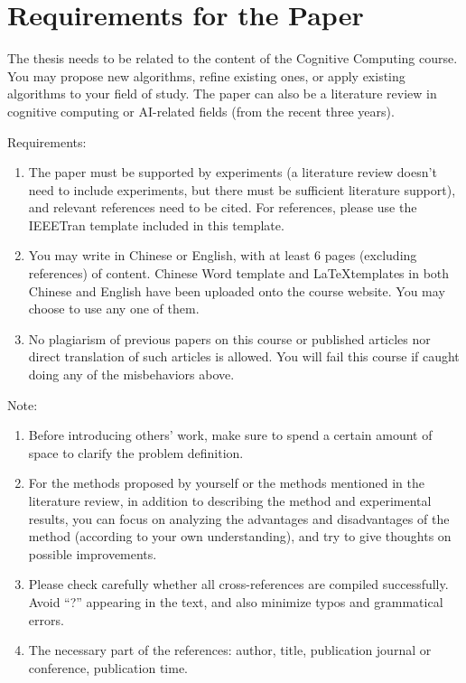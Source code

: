 \documentclass[conference]{IEEEtran}
\begin{document}
\section*{Requirements for the Paper}

The thesis needs to be related to the content of the Cognitive Computing course. You may propose new algorithms, refine existing ones, or apply existing algorithms to your field of study. The paper can also be a literature review in cognitive computing or AI-related fields (from the recent three years).

Requirements:
\begin{enumerate}
	\item The paper must be supported by experiments (a literature review doesn't need to include experiments, but there must be sufficient literature support), and relevant references need to be cited. For references, please use the IEEETran template included in this template.
	\item You may write in Chinese or English, with at least 6 pages (excluding references) of content. Chinese Word template and \LaTeX templates in both Chinese and English have been uploaded onto the course website. You may choose to use any one of them.
	\item No plagiarism of previous papers on this course or published articles nor direct translation of such articles is allowed. You will fail this course if caught doing any of the misbehaviors above.
\end{enumerate}

Note:
\begin{enumerate}
	\item Before introducing others' work, make sure to spend a certain amount of space to clarify the problem definition.
	\item For the methods proposed by yourself or the methods mentioned in the literature review, in addition to describing the method and experimental results, you can focus on analyzing the advantages and disadvantages of the method (according to your own understanding), and try to give thoughts on possible improvements.
	\item Please check carefully whether all cross-references are compiled successfully. Avoid ``?'' appearing in the text, and also minimize typos and grammatical errors.
	\item The necessary part of the references: author, title, publication journal or conference, publication time.
\end{enumerate}
\end{document}
